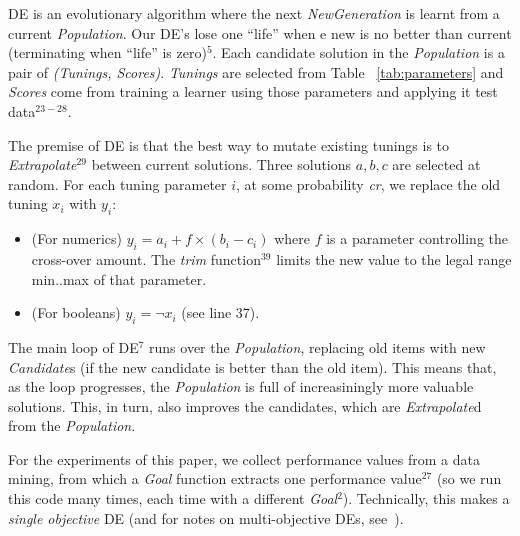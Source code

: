 \documentclass{sig-alternative}
\newcommand{\bi}{\begin{itemize}[leftmargin=0.4cm]}
\newcommand{\ei}{\end{itemize}}
\newcommand{\tab}[1]{Table ~\ref{tab:#1}}
\begin{document}
DE is an evolutionary algorithm where the next {\em NewGeneration} is learnt from
a current {\em Population}.  Our DE's lose one ``life''
when e new is no better than  current (terminating when ``life'' is zero)$^{5}$.
Each candidate solution in the {\em Population}  
is a pair of {\em (Tunings, Scores)}.  {\em Tunings} are selected from
\tab{parameters} and {\em Scores} come from training a learner using those parameters
and applying it     test data$^{23-28}$.

The premise of DE  is that the best way to mutate existing tunings
is to {\em Extrapolate}$^{29}$
between current solutions.  Three solutions $a,b,c$ are selected at random.
For each tuning parameter $i$, at some probability {\em cr}, we replace
the old tuning $x_i$ with $y_i$:
\bi
\item (For numerics) $y_i = a_i+f \times (b_i - c_i)$   where $f$ is a parameter
controlling the cross-over amount.  The {\em trim} function$^{39}$ limits the new
value to the legal range min..max of that parameter.
\item (For booleans) $y_i= \neg x_i$ (see line 37).
\ei
The main loop of DE$^{7}$ runs over the {\em Population}, replacing old items
with new {\em Candidate}s (if the new candidate is better than the old item).
This means that, as the loop progresses, the {\em Population} is full of increasiningly
more valuable solutions. This, in turn, also improves  the candidates, which are {\em Extrapolate}d
from the {\em Population}.

For the experiments of this paper, we collect performance
values from a data mining, from which a {\em Goal} function extracts one 
performance value$^{27}$ (so we run this code many times, each time with
a different {\em Goal}$^{2}$).  Technically, this makes a  {\em single objective} DE (and for notes on multi-objective DEs, see~\cite{Coello05,zhang07,5583335}).


\end{document}
